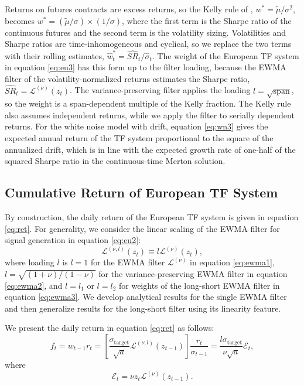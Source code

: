 \documentclass[hidelinks]{siamonline250211}
\newcommand{\spn}{\mathrm{span}}
\begin{document}
Returns on futures contracts are excess returns, so the Kelly rule of \citet{Merton1969}, $w^{*}=\tilde{\mu}/\sigma^{2}$, becomes $w^{*}=\left(\tilde{\mu}/\sigma\right)\times\left(1/\sigma\right)$, where the first term is the Sharpe ratio of the continuous futures and the second term is the volatility sizing. Volatilities and Sharpe ratios are time-inhomogeneous and cyclical, so we replace the two terms with their rolling estimates, $\widehat{w}^{*}_{t}=\widehat{SR}_{t}/\widehat{\sigma}_{t}$. The weight of the European TF system in equation \eqref{eq:eu3} has this form up to the filter loading, because the EWMA filter of the volatility-normalized returns estimates the Sharpe ratio, $\widehat{SR}_{t} = \mathcal{L}^{(\nu)} (z_{t})$. The variance-preserving filter applies the loading $l=\sqrt{\spn}$, so the weight is a span-dependent multiple of the Kelly fraction. The Kelly rule also assumes independent returns, while we apply the filter to serially dependent returns. For the white noise model with drift, equation \eqref{eq:wn3} gives the expected annual return of the TF system proportional to the square of the annualized drift, which is in line with the expected growth rate of one-half of the squared Sharpe ratio in the continuous-time Merton solution.






\subsection{Cumulative Return of European TF System}

By construction, the daily return of the European TF system is given in equation \eqref{eq:ret}. For generality, we consider the linear scaling of the EWMA filter for signal generation in equation \eqref{eq:eu2}:
\begin{equation} \label{eq:e1} 
	\mathcal{L}^{(\nu, l)} (z_{t})  \equiv l \mathcal{L}^{(\nu)} (z_{t}),
\end{equation}
where loading $l$ is $l=1$ for the EWMA filter $\mathcal{L}^{(\nu)}$ in equation \eqref{eq:ewma1}, $l=\sqrt{(1+\nu)/(1-\nu)}$ for the variance-preserving EWMA filter in equation \eqref{eq:ewma2}, and $l=l_{1}$ or $l=l_{2}$ for weights of the long-short EWMA filter in equation \eqref{eq:ewma3}. We develop analytical results for the single EWMA filter and then generalize results for the long-short filter using its linearity feature.


We present the daily return in equation \eqref{eq:ret} as follows:
\begin{equation} \label{eq:e2} 
	f_{t} = w_{t-1} r_{t} = \left[ \frac{\sigma_{\mathrm{target}}}{\sqrt{a}}\mathcal{L}^{(\nu, l)} (z_{t-1}) \right]\frac{ r_{t} }{\sigma_{t-1}}=   \frac{ l\sigma_{\mathrm{target}}}{\nu\sqrt{a}} \mathcal{E}_{t},
\end{equation}
where
\begin{equation} \label{eq:e3} 
	\mathcal{E}_{t} =    \nu z_{t}  \mathcal{L}^{(\nu)} (z_{t-1}).
\end{equation}
\end{document}
